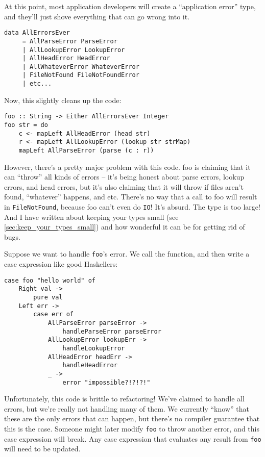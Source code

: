 At this point, most application developers will create a ``application error'' type, and they'll just shove everything that can go wrong into it.

\begin{verbatim}
data AllErrorsEver
     = AllParseError ParseError
     | AllLookupError LookupError
     | AllHeadError HeadError
     | AllWhateverError WhateverError
     | FileNotFound FileNotFoundError
     | etc...
\end{verbatim}
Now, this slightly cleans up the code:

\begin{verbatim}
foo :: String -> Either AllErrorsEver Integer
foo str = do
    c <- mapLeft AllHeadError (head str)
    r <- mapLeft AllLookupError (lookup str strMap)
    mapLeft AllParseError (parse (c : r))
\end{verbatim}
However, there's a pretty major problem with this code. foo is claiming that it can ``throw'' all kinds of errors -- it's being honest about parse errors, lookup errors, and head errors, but it's also claiming that it will throw if files aren't found, ``whatever'' happens, and etc. There's no way that a call to foo will result in \texttt{FileNotFound}, because foo can't even do \texttt{IO}! It's absurd. The type is too large! And I have written about keeping your types small (see \ref{sec:keep_your_types_small}) and how wonderful  it can be for getting rid of bugs.

Suppose we want to handle \texttt{foo}'s error. We call the function, and then write a case expression like good Haskellers:

\begin{verbatim}
case foo "hello world" of
    Right val ->
        pure val
    Left err ->
        case err of
            AllParseError parseError ->
                handleParseError parseError
            AllLookupError lookupErr ->
                handleLookupError
            AllHeadError headErr ->
                handleHeadError
            _ ->
                error "impossible?!?!?!"
\end{verbatim}
Unfortunately, this code is brittle to refactoring! We've claimed to handle all errors, but we're really not handling many of them. We currently ``know'' that these are the only errors that can happen, but there's no compiler guarantee that this is the case. Someone might later modify \texttt{foo} to throw another error, and this case expression will break. Any case expression that evaluates any result from \texttt{foo} will need to be updated.

